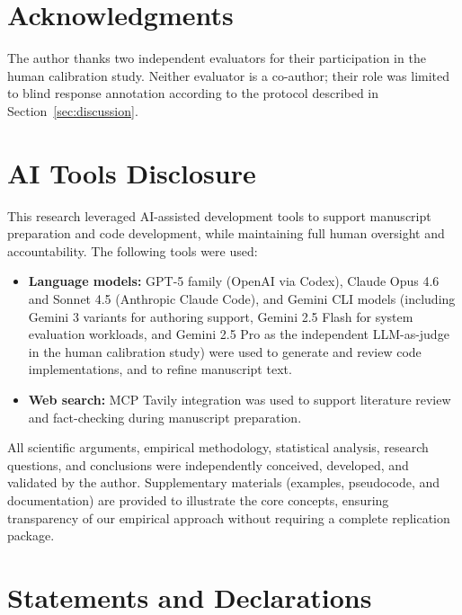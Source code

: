 \documentclass[twocolumn]{svjour3}          %
\begin{document}








\section*{Acknowledgments}
The author thanks two independent evaluators for their participation in the human calibration study. Neither evaluator is a co-author; their role was limited to blind response annotation according to the protocol described in Section~\ref{sec:discussion}.

\section*{AI Tools Disclosure}

This research leveraged AI-assisted development tools to support manuscript preparation and code development, while maintaining full human oversight and accountability. The following tools were used:
\begin{itemize}
    \item \textbf{Language models:} GPT-5 family (OpenAI via Codex),
    Claude Opus 4.6 and Sonnet 4.5 (Anthropic Claude Code), and
    Gemini CLI models (including Gemini 3 variants for authoring support,
    Gemini 2.5 Flash for system evaluation workloads, and
    Gemini 2.5 Pro as the independent LLM-as-judge in the human calibration study)
    were used to generate and review code implementations, and to refine manuscript text.

    \item \textbf{Web search:} MCP Tavily integration was used to support literature review and fact-checking during manuscript preparation.
\end{itemize}

All scientific arguments, empirical methodology, statistical analysis, research questions, and conclusions were independently conceived, developed, and validated by the author. Supplementary materials (examples, pseudocode, and documentation) are provided to illustrate the core concepts, ensuring transparency of our empirical approach without requiring a complete replication package.

\section*{Statements and Declarations}
\end{document}
